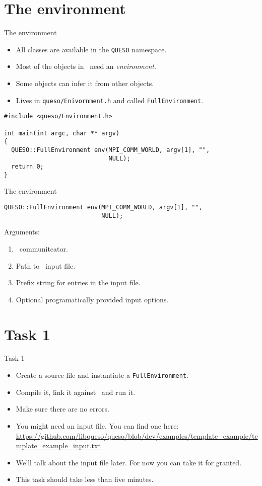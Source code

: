 \section{The environment}
\begin{frame}[fragile]{The environment}
  \begin{itemize}
    \item All classes are available in the \texttt{QUESO} namespace.
    \item Most of the objects in \Queso\ need an \emph{environment}.
    \item Some objects can infer it from other objects.
    \item Lives in \texttt{queso/Enivornment.h} and called \texttt{FullEnvironment}.
  \end{itemize}
  \begin{verbatim}
#include <queso/Environment.h>

int main(int argc, char ** argv)
{
  QUESO::FullEnvironment env(MPI_COMM_WORLD, argv[1], "",
                             NULL);
  return 0;
}
  \end{verbatim}
\end{frame}

\begin{frame}[fragile]{The environment}
  \begin{verbatim}
QUESO::FullEnvironment env(MPI_COMM_WORLD, argv[1], "",
                           NULL);
  \end{verbatim}
  Arguments:
  \begin{enumerate}
    \item \Mpi\ communitcator.
    \item Path to \Queso\ input file.
    \item Prefix string for entries in the input file.
    \item Optional programatically provided input options.
  \end{enumerate}
\end{frame}

\section{Task 1}
\begin{frame}[fragile]{Task 1}
  \begin{itemize}
    \item Create a source file and instantiate a \texttt{FullEnvironment}.
    \item Compile it, link it against \Queso\ and run it.
    \item  Make sure there are no errors.
    \item You might need an input file.  You can find one here:
      \url{https://github.com/libqueso/queso/blob/dev/examples/template_example/template_example_input.txt}
    \item We'll talk about the input file later.  For now you can take it for
      granted.
    \item This task should take less than five minutes.
  \end{itemize}
\end{frame}
